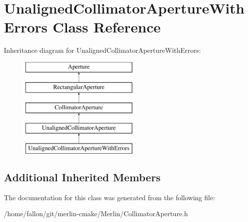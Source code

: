 \hypertarget{classUnalignedCollimatorApertureWithErrors}{}\section{Unaligned\+Collimator\+Aperture\+With\+Errors Class Reference}
\label{classUnalignedCollimatorApertureWithErrors}
Inheritance diagram for Unaligned\+Collimator\+Aperture\+With\+Errors\+:\begin{figure}[H]
\begin{center}
\leavevmode
\includegraphics[height=5.000000cm]{classUnalignedCollimatorApertureWithErrors}
\end{center}
\end{figure}
\subsection*{Additional Inherited Members}


The documentation for this class was generated from the following file\+:\begin{DoxyCompactItemize}
\item 
/home/fallon/git/merlin-\/cmake/\+Merlin/Collimator\+Aperture.\+h\end{DoxyCompactItemize}

